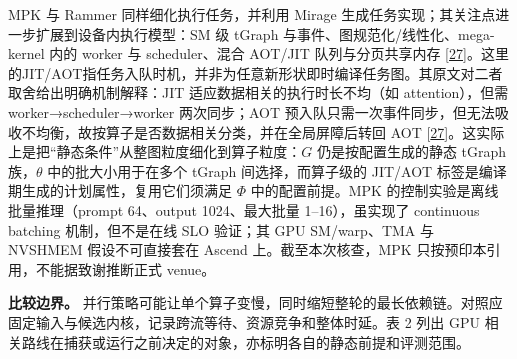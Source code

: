 \documentclass[
  UTF8,
  zihao=5]{ctexart}
\begin{document}
MPK 与 Rammer 同样细化执行任务，并利用 Mirage
生成任务实现；其关注点进一步扩展到设备内执行模型：SM 级 tGraph
与事件、图规范化/线性化、mega-kernel 内的 worker 与 scheduler、混合
AOT/JIT 队列与分页共享内存
{[}\protect\hyperlink{ref-cheng2026mpk}{27}{]}。这里的JIT/AOT指任务入队时机，并非为任意新形状即时编译任务图。其原文对二者取舍给出明确机制解释：JIT
适应数据相关的执行时长不均（如 attention），但需 worker→scheduler→worker
两次同步；AOT
预入队只需一次事件同步，但无法吸收不均衡，故按算子是否数据相关分类，并在全局屏障后转回
AOT
{[}\protect\hyperlink{ref-cheng2026mpk}{27}{]}。这实际上是把``静态条件''从整图粒度细化到算子粒度：\(G\)
仍是按配置生成的静态 tGraph 族，\(\theta\) 中的批大小用于在多个 tGraph
间选择，而算子级的 JIT/AOT 标签是编译期生成的计划属性，复用它们须满足
\(\Phi\) 中的配置前提。MPK 的控制实验是离线批量推理（prompt 64、output
1024、最大批量 1--16），虽实现了 continuous batching 机制，但不是在线
SLO 验证；其 GPU SM/warp、TMA 与 NVSHMEM 假设不可直接套在 Ascend
上。截至本次核查，MPK 只按预印本引用，不能据致谢推断正式 venue。

\textbf{比较边界。}
并行策略可能让单个算子变慢，同时缩短整轮的最长依赖链。对照应固定输入与候选内核，记录跨流等待、资源竞争和整体时延。表
2 列出 GPU
相关路线在捕获或运行之前决定的对象，亦标明各自的静态前提和评测范围。
\end{document}
